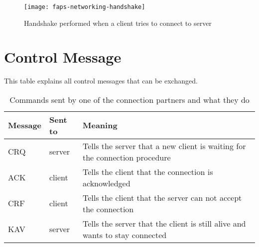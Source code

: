 \begin{figure}[H]
    \centering
    \texttt{[image: faps-networking-handshake]}
    \caption{Handshake performed when a client tries to connect to server}
    \label{fig:faps-networking-handshake}
\end{figure}

\section{Control Message}

This table explains all control messages that can be exchanged.

\begin{table}[H]
    \centering
    \begin{tabular}{| l | l | p{5cm} |}
    \hline
    \textbf{Message} & \textbf{Sent to} & \textbf{Meaning} \\ \hline
    CRQ & server & Tells the server that a new client is waiting for the connection procedure \\ \hline
    ACK & client & Tells the client that the connection is acknowledged \\ \hline
    CRF & client & Tells the client that the server can not accept the connection \\ \hline
    KAV & server & Tells the server that the client is still alive and wants to stay connected \\
    \hline
    \end{tabular}
    \caption{Commands sent by one of the connection partners and what they do}
    \label{tab:faps-networking-control-messages}
\end{table}

